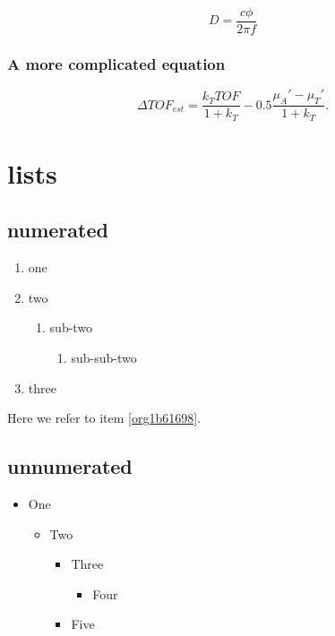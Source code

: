 \begin{equation}
\label{eq:orgfbe612c}
D = \frac{c\phi}{2\pi f}
\end{equation}

\subsubsection{A more complicated equation}
\label{sec:org0f469c5}

\begin{equation}
\Delta TOF_{est} = \frac{k_T TOF}{1+k_T } - 0.5 \frac{\mu_A' - \mu_T'}{1+k_T}.
\end{equation}

\section{lists}
\label{sec:org8d9131e}
\subsection{numerated}
\label{sec:orgd0f0de6}
\begin{enumerate}
\item one
\item two
\begin{enumerate}
\item sub-two
\begin{enumerate}
\item sub-sub-two
\end{enumerate}
\end{enumerate}
\item \label{org1b61698}three
\end{enumerate}

Here we refer to item \ref{org1b61698}.

\subsection{unnumerated}
\label{sec:org86b0a1e}
\begin{itemize}
\item One
\begin{itemize}
\item Two
\begin{itemize}
\item Three
\begin{itemize}
\item Four
\end{itemize}
\item Five
\end{itemize}
\end{itemize}
\end{itemize}

